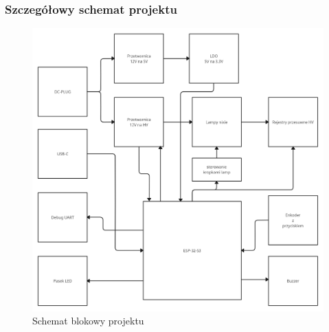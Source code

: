 \documentclass[../main.tex]{subfiles}
\begin{document}
\subsubsection{Szczegółowy schemat projektu}
\begin{figure}[H]
    \centering
    \includegraphics[width=1\textwidth]{schemat_blokowy.jpg}
    \caption{Schemat blokowy projektu}
    \label{fig:schemat_projektu}
\end{figure}
\end{document}
